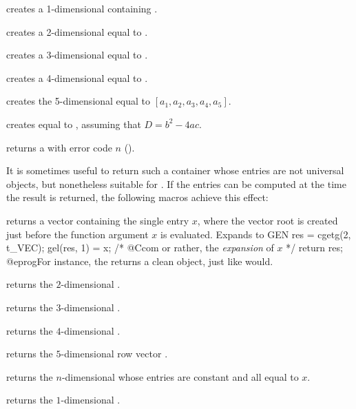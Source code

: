  creates a 1-dimensional  containing .

 creates a 2-dimensional  equal to
\kbd{[x,y]}.

 creates a 3-dimensional 
equal to \kbd{[x,y,z]}.

 creates a 4-dimensional 
equal to \kbd{[x,y,z,t]}.

 creates the
5-dimensional  equal to $[a_1,a_2,a_3,a_4,a_5]$.

 creates  equal
to , assuming that $D = b^2 - 4ac$.

 returns a  with error code $n$
().

\smallskip

It is sometimes useful to return such a container whose entries are not
universal objects, but nonetheless suitable for .
If the entries can be computed at the time the result is returned, the
following macros achieve this effect:

 returns a vector containing the single entry $x$,
where the vector root is created just before the function argument $x$ is
evaluated. Expands to
\bprog
  {
    GEN res = cgetg(2, t_VEC);
    gel(res, 1) = x; /* @Ccom or rather, the \emph{expansion} of $x$ */
    return res;
  }
@eprog\noindent For instance, the  returns a clean
object, just like  would.

returns the $2$-dimensional  \kbd{[x,y]}.

returns the $3$-dimensional  \kbd{[x,y,z]}.

returns the $4$-dimensional  \kbd{[x,y,z,t]}.

returns the $5$-dimensional row vector \kbd{[x,y,z,t,u]}.

returns the $n$-dimensional  whose entries are constant and all
equal to $x$.

returns the $1$-dimensional  \kbd{[x]~}.

